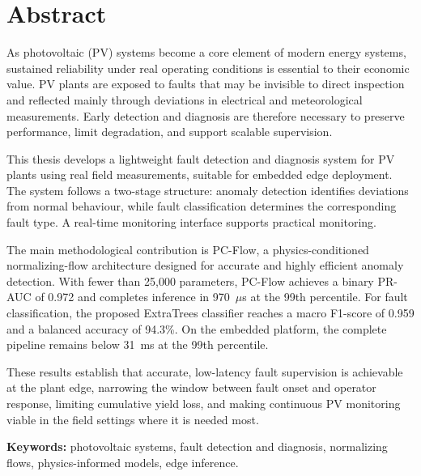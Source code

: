 \chapter*{Abstract}

As photovoltaic (PV) systems become a core element of modern energy systems, sustained reliability under real operating conditions is essential to their economic value. PV plants are exposed to faults that may be invisible to direct inspection and reflected mainly through deviations in electrical and meteorological measurements. Early detection and diagnosis are therefore necessary to preserve performance, limit degradation, and support scalable supervision.

This thesis develops a lightweight fault detection and diagnosis system for PV plants using real field measurements, suitable for embedded edge deployment. The system follows a two-stage structure: anomaly detection identifies deviations from normal behaviour, while fault classification determines the corresponding fault type. A real-time monitoring interface supports practical monitoring.

The main methodological contribution is PC-Flow, a physics-conditioned normalizing-flow architecture designed for accurate and highly efficient anomaly detection. With fewer than 25{,}000 parameters, PC-Flow achieves a binary PR-AUC of 0.972 and completes inference in 970~$\mu$s at the 99th percentile. For fault classification, the proposed ExtraTrees classifier reaches a macro F1-score of 0.959 and a balanced accuracy of 94.3\%. On the embedded platform, the complete pipeline remains below 31~ms at the 99th percentile.

These results establish that accurate, low-latency fault supervision is achievable at the plant edge, narrowing the window between fault onset and operator response, limiting cumulative yield loss, and making continuous PV monitoring viable in the field settings where it is needed most.

\vspace{1cm}
\noindent\textbf{Keywords:} photovoltaic systems, fault detection and diagnosis, normalizing flows, physics-informed models, edge inference.
